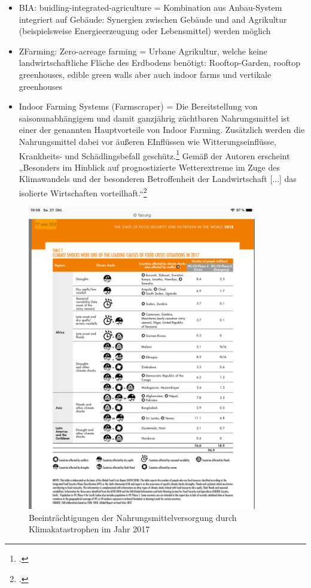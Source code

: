 \documentclass{scrartcl}
\begin{document}
\begin{itemize}
    \item BIA: buidling-integrated-agriculture = Kombination aus Anbau-System integriert auf  Gebäude: Synergien zwischen Gebäude und  and Agrikultur (beispielsweise Energieerzeugung oder Lebensmittel) werden möglich
    \item ZFarming: Zero-acreage farming = Urbane Agrikultur, welche keine landwirtschaftliche Fläche des Erdbodens benötigt: Rooftop-Garden, rooftop greenhouses, edible green walls aber auch indoor farms und vertikale greenhouses
    \item Indoor Farming Systems (Farmscraper) = Die Bereitstellung von saisonunabhängigem und damit ganzjährig züchtbaren Nahrungsmittel ist einer der genannten Hauptvorteile von Indoor Farming. Zusätzlich werden die Nahrungsmittel dabei vor äußeren EInflüssen wie Witterungseinflüsse, Krankheits- und Schädlingsbefall geschütz.\footcite{Schulz2013UrbaneLandmanagements} Gemäß der Autoren erscheint „Besonders im Hinblick auf prognostizierte Wetterextreme im Zuge des Klimawandels und der besonderen Betroffenheit der Landwirtschaft [...] das isolierte Wirtschaften vorteilhaft.“\footcite{Schulz2013UrbaneLandmanagements}
\end{itemize}


\begin{figure}[htbp]
\centering
\includegraphics[width=10cm]{image_folder/beeintrachtigungklima.png}
\caption{Beeinträchtigungen der Nahrungsmittelversorgung durch Klimakatastrophen im Jahr 2017}
\label{fig:Die Grafik visualisiert den Zusammenhang zwischen Klima und Versorgung: Beeinträchtigungen der Nahrungsmittelversorgung durch Klimakatastrophen im Jahr 2017}
\end{figure}
   
\end{document}
